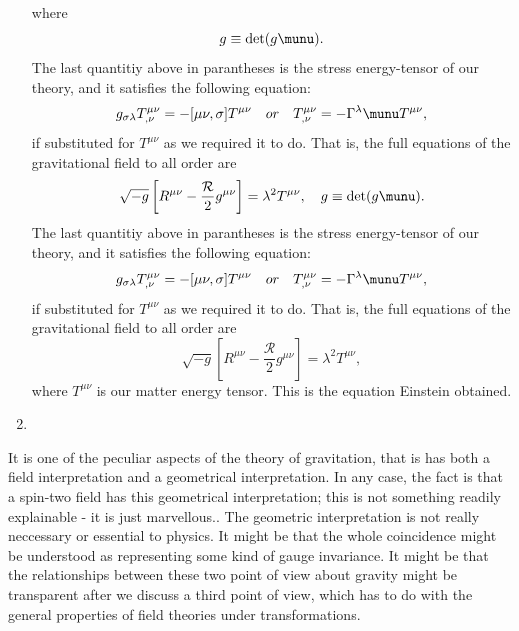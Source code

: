 \begin{enumerate}
\begin{equation}
\end{equation}
where
\begin{equation}
	g \equiv \det(g\munu).
\end{equation}
The last quantitiy above in parantheses is the stress energy-tensor of our theory, and it satisfies the following equation:
\begin{equation}
	g_{\sigma \lambda} T^{\mu \nu}_{, \nu} = - [\mu \nu, \sigma] T^{\mu \nu} \quad or \quad T^{\mu \nu}_{,\nu} = - \Gamma^\lambda\munu T^{\mu \nu},
\end{equation}
if substituted for $T^{\mu \nu}$ as we required it to do. That is, the full equations of the gravitational field to all order are
\begin{equation}
	\sqrt{-g} \left[R^{\mu \nu} - \frac{\mathcal{R}}{2 } g^{\mu \nu} \right] = \lambda^2 T^{\mu \nu}, \quad
	g \equiv \det(g\munu).
\end{equation}
The last quantitiy above in parantheses is the stress energy-tensor of our theory, and it satisfies the following equation:
\begin{equation}
	g_{\sigma \lambda} T^{\mu \nu}_{, \nu} = - [\mu \nu, \sigma] T^{\mu \nu} \quad or \quad T^{\mu \nu}_{,\nu} = - \Gamma^\lambda\munu T^{\mu \nu},
\end{equation}
if substituted for $T^{\mu \nu}$ as we required it to do. That is, the full equations of the gravitational field to all order are
\begin{equation}
	\sqrt{-g} \left[R^{\mu \nu} - \frac{\mathcal{R}}{2 } g^{\mu \nu} \right] = \lambda^2 T^{\mu \nu},
\end{equation}
where $T^{\mu \nu}$ is our matter energy tensor. This is the equation Einstein obtained.

\item







\end{enumerate}








It is one of the peculiar aspects of the theory of gravitation, that is has both a field interpretation and a geometrical interpretation. In any case, the fact is that a spin-two field has this geometrical interpretation; this is not something readily explainable - it is just marvellous.. The geometric interpretation is not really neccessary or essential to physics. It might be that the whole coincidence might be understood as representing some kind of gauge invariance. It might be that the relationships between these two point of view about gravity might be transparent after we discuss a third point of view, which has to do with the general properties of field theories under transformations.
